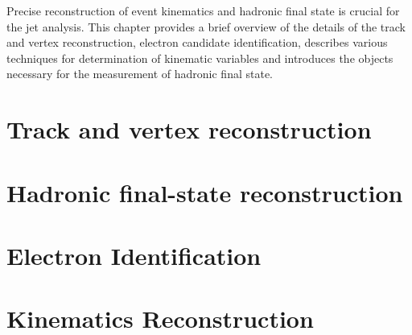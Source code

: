Precise reconstruction of event kinematics and hadronic final state is crucial for the jet analysis. This chapter provides a brief overview of the details of the track and vertex reconstruction, electron candidate identification, describes various techniques for determination of kinematic variables and introduces the objects necessary for the measurement of hadronic final state. 

\section{Track and vertex reconstruction}
\label{sec:trackvtxreco}


\section{Hadronic final-state reconstruction}
\label{sec:hadronreco}


\section{Electron Identification}
\label{sec:eleid}


\section{Kinematics Reconstruction}
\label{sec:kinrec}



